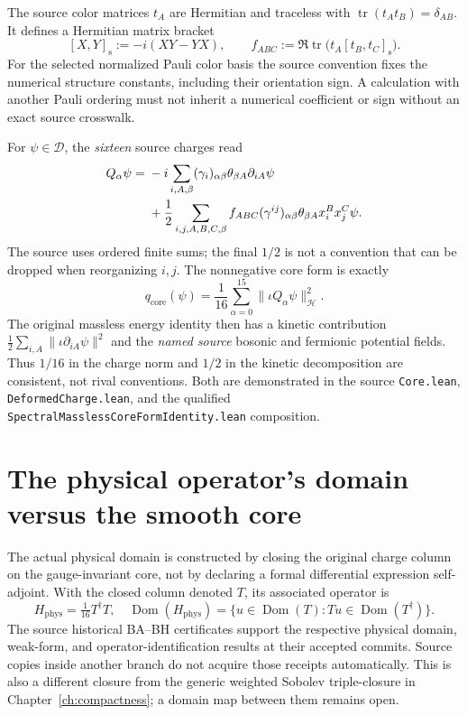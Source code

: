 The source color matrices $t_A$ are Hermitian and traceless with
$\operatorname{tr}(t_At_B)=\delta_{AB}$. It defines a Hermitian
matrix bracket
\begin{equation}\label{eq:appendix-color-bracket}
 [X,Y]_{\mathrm{s}}:=-i(XY-YX),\qquad
 f_{ABC}:=\Re\operatorname{tr}
  \bigl(t_A[t_B,t_C]_{\mathrm{s}}\bigr).
\end{equation}
For the selected normalized Pauli color basis the source convention
fixes the numerical structure constants, including their orientation
sign. A calculation with another Pauli ordering must not inherit a
numerical coefficient or sign without an exact source crosswalk.

For $\psi\in\mathscr D$, the \emph{sixteen} source charges read
\begin{align}\label{eq:appendix-charges}
 Q_\alpha\psi={}&-i\sum_{i,A,\beta}
 (\gamma_i)_{\alpha\beta}\theta_{\beta A}\partial_{iA}\psi\\
 &+\frac12\sum_{i,j,A,B,C,\beta}
 f_{ABC}(\gamma^{ij})_{\alpha\beta}
 \theta_{\beta A}x_i^Bx_j^C\psi.\notag
\end{align}
The source uses ordered finite sums; the final $1/2$ is not a
convention that can be dropped when reorganizing $i,j$.
The nonnegative core form is exactly
\begin{equation}\label{eq:appendix-core-form}
 q_{\mathrm{core}}(\psi)=\frac1{16}\sum_{\alpha=0}^{15}
  \|\iota Q_\alpha\psi\|_{\mathscr H}^2.
\end{equation}
The original massless energy identity then has a kinetic contribution
$\tfrac12\sum_{i,A}\|\iota\partial_{iA}\psi\|^2$ and the \emph{named
source} bosonic and fermionic potential fields. Thus $1/16$ in the
charge norm and $1/2$ in the kinetic decomposition are consistent,
not rival conventions. Both are demonstrated in the source
\texttt{Core.lean}, \texttt{DeformedCharge.lean}, and the qualified
\texttt{SpectralMasslessCoreFormIdentity.lean} composition.

\section{The physical operator's domain versus the smooth core}

The actual physical domain is constructed by closing the original
charge column on the gauge-invariant core, not by declaring a formal
differential expression self-adjoint. With the closed column denoted
$T$, its associated operator is
\begin{equation}\label{eq:appendix-domain}
 H_{\mathrm{phys}}=\tfrac1{16}T^\dagger T,
 \quad\operatorname{Dom}(H_{\mathrm{phys}})
 =\{u\in\operatorname{Dom}(T):Tu\in\operatorname{Dom}(T^\dagger)\}.
\end{equation}
The source historical BA--BH certificates support the respective
physical domain, weak-form, and operator-identification results at
their accepted commits. Source copies inside another branch do not
acquire those receipts automatically. This is also a different closure
from the generic weighted Sobolev triple-closure in
Chapter~\ref{ch:compactness}; a domain map between them remains open.

